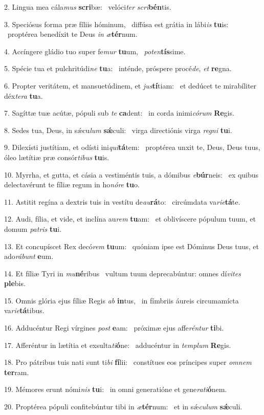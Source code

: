 2. Lingua mea cála\textit{mus} \textbf{scri}bæ: \ast\  velóci\textit{ter} \textit{scri}\textbf{bén}tis.\

3. Speciósus forma præ fíliis hóminum, \dag\  diffúsa est grátia in lábi\textit{is} \textbf{tu}is: \ast\  proptérea benedíxit te Deus \textit{in} \textit{æ}\textbf{tér}num.\

4. Accíngere gládio tuo super fe\textit{mur} \textbf{tu}um, \ast\  \textit{pot}\textit{en}\textbf{tís}sime.\

5. Spécie tua et pulchritúdi\textit{ne} \textbf{tu}a: \ast\  inténde, próspere procé\textit{de}, \textit{et} \textbf{re}gna.\

6. Propter veritátem, et mansuetúdinem, et \textit{jus}\textbf{tí}tiam: \ast\  et dedúcet te mirabíliter déx\textit{te}\textit{ra} \textbf{tu}a.\

7. Sagíttæ tuæ acútæ, pópuli sub \textit{te} \textbf{ca}dent: \ast\  in corda inimi\textit{có}\textit{rum} \textbf{Re}gis.\

8. Sedes tua, Deus, in sǽcu\textit{lum} \textbf{sǽ}culi: \ast\  virga directiónis virga \textit{re}\textit{gni} \textbf{tu}i.\

9. Dilexísti justítiam, et odísti ini\textit{qui}\textbf{tá}tem: \ast\  proptérea unxit te, Deus, Deus tuus, óleo lætítiæ præ consór\textit{ti}\textit{bus} \textbf{tu}is.\

10. Myrrha, et gutta, et cásia a vestiméntis tuis, a dómibus \textit{e}\textbf{búr}neis: \ast\  ex quibus delectavérunt te fíliæ regum in ho\textit{nó}\textit{re} \textbf{tu}o.\

11. Astitit regína a dextris tuis in vestítu de\textit{au}\textbf{rá}to: \ast\  circúmdata va\textit{ri}\textit{e}\textbf{tá}te.\

12. Audi, fília, et vide, et inclína au\textit{rem} \textbf{tu}am: \ast\  et oblivíscere pópulum tuum, et domum \textit{pa}\textit{tris} \textbf{tu}i.\

13. Et concupíscet Rex decó\textit{rem} \textbf{tu}um: \ast\  quóniam ipse est Dóminus Deus tuus, et ado\textit{rá}\textit{bunt} \textbf{e}um.\

14. Et fíliæ Tyri in \textit{mu}\textbf{né}ribus \ast\  vultum tuum deprecabúntur: omnes dí\textit{vi}\textit{tes} \textbf{ple}bis.\

15. Omnis glória ejus fíliæ Regis \textit{ab} \textbf{in}tus, \ast\  in fímbriis áureis circumamícta va\textit{ri}\textit{e}\textbf{tá}tibus.\

16. Adducéntur Regi vírgines \textit{post} \textbf{e}am: \ast\  próximæ ejus affe\textit{rén}\textit{tur} \textbf{ti}bi.\

17. Afferéntur in lætítia et exsulta\textit{ti}\textbf{ó}ne: \ast\  adducéntur in \textit{tem}\textit{plum} \textbf{Re}gis.\

18. Pro pátribus tuis nati sunt ti\textit{bi} \textbf{fí}lii: \ast\  constítues eos príncipes super \textit{om}\textit{nem} \textbf{ter}ram.\

19. Mémores erunt nómi\textit{nis} \textbf{tu}i: \ast\  in omni generatióne et gene\textit{ra}\textit{ti}\textbf{ó}nem.\

20. Proptérea pópuli confitebúntur tibi in \textit{æ}\textbf{tér}num: \ast\  et in sǽ\textit{cu}\textit{lum} \textbf{sǽ}culi.\

